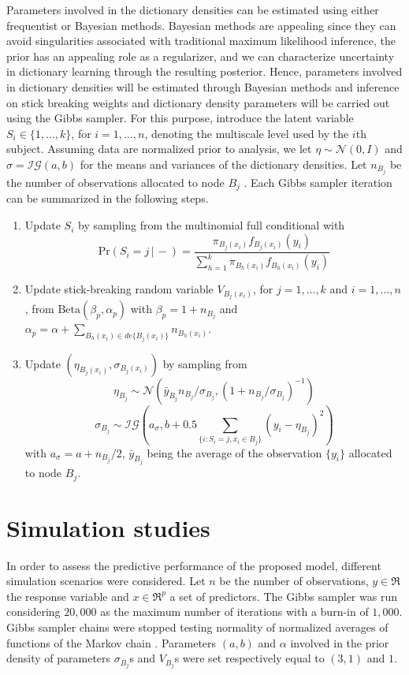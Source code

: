 \documentclass{article} %
\providecommand{\mc}[1]{\mathcal{#1}}
\begin{document}
Parameters involved in the dictionary densities can be estimated using either frequentist or Bayesian methods. Bayesian methods are appealing since they can avoid singularities associated with traditional maximum likelihood inference, the prior has an appealing role as a regularizer, and we can characterize uncertainty in dictionary learning through the resulting posterior.
Hence, parameters involved in dictionary densities will be estimated through Bayesian methods and inference on stick breaking weights and dictionary density parameters will be carried out using the Gibbs sampler. For this purpose, introduce the latent variable $S_i \in \{1,\ldots,k\}$, for $i=1,\ldots,n$, denoting the multiscale level used by the $i$th subject.  Assuming data are normalized prior to analysis, we let $\eta \sim \mc{N}(0,I)$ and $\sigma=\mc{IG}(a,b)$ for the means and variances of the dictionary densities. Let $n_{B_j}$ be  the number of observations allocated to node $B_j$ . Each Gibbs sampler iteration can be summarized in the following steps.
\begin{enumerate}
\item Update $S_i$ by sampling from the multinomial full conditional with 
\[\mbox{Pr}( S_i = j\, |\, -) = \frac{ \pi_{B_j(x_i)}f_{B_j(x_i)}(y_i) }{ \sum_{h=1}^k \pi_{B_h(x_i)}f_{B_h(x_i)}(y_i) } \label{eq:prS}\]
\item Update stick-breaking random variable $V_{B_j(x_i)}$, for $j=1, \ldots, k$ and $i=1, \ldots, n$, from $\mbox{Beta}(\beta_p,\alpha_p)$ with $\beta_p=1+n_{B_j}$ and $\alpha_p=\alpha+\sum_{B_h(x_i) \in de\{B_j(x_i)\}} n_{B_h(x_i)}$.
\item Update $(\eta_{B_j(x_i)},\sigma_{B_j(x_i)})$ by sampling from
\[  \eta_{B_j} \sim \mc{N}\left(\bar{y}_{B_j} n_{B_j}/\sigma_{B_j},(1+n_{B_j}/\sigma_{B_j})^{-1}\right)\]
\[ \sigma_{B_j} \sim \mc{IG}\left(a_{\sigma},b+0.5\sum_{\{i: S_i=j,x_i \in B_j\}} \left(y_{i}-\eta_{B_j}\right)^2\right)\]
with $a_{\sigma}=a+n_{B_j}/2$, $\bar{y}_{B_j}$ being the average of the observation $\{y_i\}$ allocated to node $B_j$.

\end{enumerate}


\section{Simulation studies}\label{section:simulation}

In order to assess the predictive performance of the proposed model, different simulation scenarios were considered. Let $n$ be the number of observations, $y \in \Re$ the response variable and $x \in \Re^p$ a set of predictors. The Gibbs sampler was run considering $20,000$ as the maximum number of iterations with a burn-in of $1,000$. Gibbs sampler chains were stopped testing normality of normalized averages of functions of the Markov chain \cite{Chauveau98anautomated}. Parameters $(a,b)$ and $\alpha$ involved in the prior density of parameters $\sigma_{B_j}$s and $V_{B_j}$s were set respectively equal to $(3,1)$ and $1$.
\end{document}
